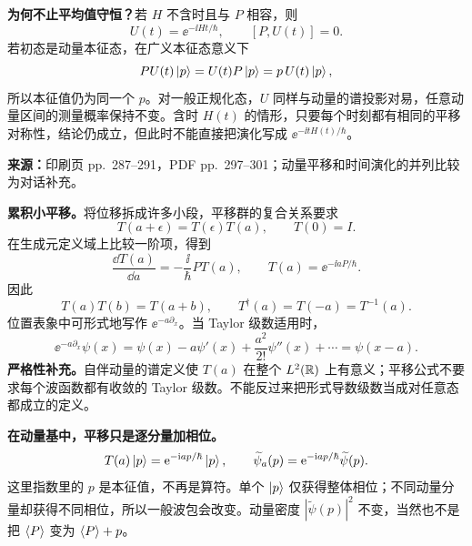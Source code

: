 \textbf{为何不止平均值守恒？}若 $H$ 不含时且与 $P$ 相容，则
\begin{equation}
  U(t)=\ee^{-\ii Ht/\hbar},\qquad [P,U(t)]=0.
\end{equation}
若初态是动量本征态，在广义本征态意义下
\begin{equation}
  PU(t)\left|p\right\rangle=U(t)P\left|p\right\rangle=p\,U(t)\left|p\right\rangle,
\end{equation}
所以本征值仍为同一个 $p$。对一般正规化态，$U$ 同样与动量的谱投影对易，任意动量区间的测量概率保持不变。含时 $H(t)$ 的情形，只要每个时刻都有相同的平移对称性，结论仍成立，但此时不能直接把演化写成 $\ee^{-\ii tH(t)/\hbar}$。

\textbf{来源：}印刷页 pp.~287--291，PDF pp.~297--301；动量平移和时间演化的并列比较为对话补充。

\textbf{累积小平移。}将位移拆成许多小段，平移群的复合关系要求
\begin{equation}
  T(a+\epsilon)=T(\epsilon)T(a),\qquad T(0)=I.
\end{equation}
在生成元定义域上比较一阶项，得到
\begin{equation}
  \frac{\dd T(a)}{\dd a}=-\frac{\ii}{\hbar}PT(a),
  \qquad \boxed{T(a)=\ee^{-\ii aP/\hbar}}.
\end{equation}
因此
\begin{equation}
  T(a)T(b)=T(a+b),\qquad T^\dagger(a)=T(-a)=T^{-1}(a).
\end{equation}
位置表象中可形式地写作 $\ee^{-a\partial_x}$。当 Taylor 级数适用时，
\begin{equation}
  \ee^{-a\partial_x}\psi(x)
    =\psi(x)-a\psi'(x)+\frac{a^2}{2!}\psi''(x)+\cdots
    =\psi(x-a).
\end{equation}
\textbf{严格性补充。}自伴动量的谱定义使 $T(a)$ 在整个 $L^2(\mathbb{R})$ 上有意义；平移公式不要求每个波函数都有收敛的 Taylor 级数。不能反过来把形式导数级数当成对任意态都成立的定义。

\textbf{在动量基中，平移只是逐分量加相位。}
\begin{equation}
  T(a)\left|p\right\rangle=\mathrm{e}^{-\mathrm{i} ap/\hbar}\left|p\right\rangle,
  \qquad \widetilde\psi_a(p)=\mathrm{e}^{-\mathrm{i} ap/\hbar}\widetilde\psi(p).
\end{equation}
这里指数里的 $p$ 是本征值，不再是算符。单个 $\left|p\right\rangle$ 仅获得整体相位；不同动量分量却获得不同相位，所以一般波包会改变。动量密度 $|\widetilde\psi(p)|^2$ 不变，当然也不是把 $\left\langle P \right\rangle$ 变为 $\left\langle P \right\rangle+p$。

